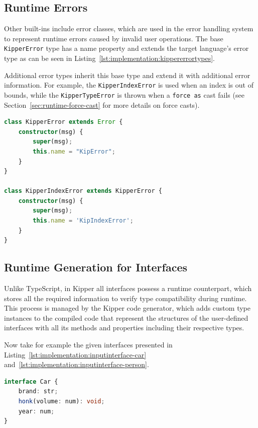 \subsection{Runtime Errors}

Other built-ins include error classes, which are used in the error handling system to represent runtime errors caused by invalid user operations. The base \lstinline|KipperError| type has a name property and extends the target language's error type as can be seen in Listing~\ref{lst:implementation:kippererrortypes}. 

Additional error types inherit this base type and extend it with additional error information. For example, the \lstinline|KipperIndexError| is used when an index is out of bounds, while the \lstinline|KipperTypeError| is thrown when a \lstinline|force as| cast fails (see Section~\ref{sec:runtime-force-cast} for more details on force casts).

\begin{lstlisting}[float,language=Typescript,caption=Kipper error types,label=lst:implementation:kippererrortypes]
class KipperError extends Error {
	constructor(msg) {
		super(msg);
		this.name = "KipError";
	}
}

class KipperIndexError extends KipperError {
	constructor(msg) { 
		super(msg); 
		this.name = 'KipIndexError'; 
	} 
}
\end{lstlisting}

\subsection{Runtime Generation for Interfaces}
\label{sec:runtime-interfaces}

Unlike TypeScript, in Kipper all interfaces possess a runtime counterpart, which stores all the required information to verify type compatibility during runtime. This process is managed by the Kipper code generator, which adds custom type instances to the compiled code that represent the structures of the user-defined interfaces with all its methods and properties including their respective types.

Now take for example the given interfaces presented in Listing~\ref{lst:implementation:inputinterface-car} and~\ref{lst:implementation:inputinterface-person}.

\begin{lstlisting}[language=Typescript,caption=Example interface \lstinline|Car| in the Kipper language,label=lst:implementation:inputinterface-car]
interface Car {
	brand: str;
	honk(volume: num): void;
	year: num;
}
\end{lstlisting}

